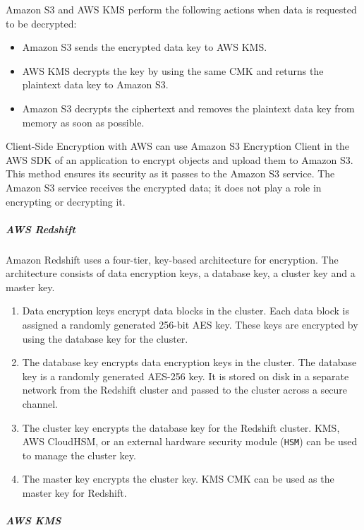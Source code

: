 \documentclass[10pt]{article}
\begin{document}
Amazon S3 and AWS KMS perform the following actions when data is requested to be decrypted:
\begin{itemize}
    \item Amazon S3 sends the encrypted data key to AWS KMS.
    \item AWS KMS decrypts the key by using the same CMK and returns the plaintext data key to Amazon S3.
    \item Amazon S3 decrypts the ciphertext and removes the plaintext data key from memory as soon as possible.
\end{itemize}

Client-Side Encryption with AWS can use Amazon S3 Encryption Client in the AWS SDK of an application to encrypt objects and upload them to Amazon S3. This method ensures its security as it passes to the Amazon S3 service. The Amazon S3 service receives the encrypted data; it does not play a role in encrypting or decrypting it.

\subparagraph{AWS Redshift}
Amazon Redshift uses a four-tier, key-based architecture for encryption. The architecture consists of data encryption keys, a database key, a cluster key and a master key.
\\
\begin{enumerate}
	\item Data encryption keys encrypt data blocks in the cluster. Each data block is assigned a randomly generated 256-bit AES key. These keys are encrypted by using the database key for the cluster.
	\item The database key encrypts data encryption keys in the cluster. The database key is a randomly generated AES-256 key. It is stored on disk in a separate network from the Redshift cluster and passed to the cluster across a secure channel.
	\item The cluster key encrypts the database key for the Redshift cluster.  KMS, AWS CloudHSM, or an external hardware security module (\texttt{HSM}) can be used to manage the cluster key.
	\item The master key encrypts the cluster key. KMS CMK can be used as the master key for Redshift.
\end{enumerate}


\subparagraph{AWS KMS}
\end{document}
